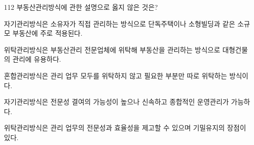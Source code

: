 \begin{question}{112}
부동산관리방식에 관한 설명으로 옳지 않은 것은?
\begin{choices}
  \item 자기관리방식은 소유자가 직접 관리하는 방식으로 단독주택이나 소형빌딩과 같은 소규모 부동산에 주로 적용된다.
  \item 위탁관리방식은 부동산관리 전문업체에 위탁해 부동산을 관리하는 방식으로 대형건물의 관리에 유용하다.
  \item 혼합관리방식은 관리 업무 모두를 위탁하지 않고 필요한 부분만 따로 위탁하는 방식이다.
  \item 자기관리방식은 전문성 결여의 가능성이 높으나 신속하고 종합적인 운영관리가 가능하다.
  \item 위탁관리방식은 관리 업무의 전문성과 효율성을 제고할 수 있으며 기밀유지의 장점이 있다.
\end{choices}
\end{question}
